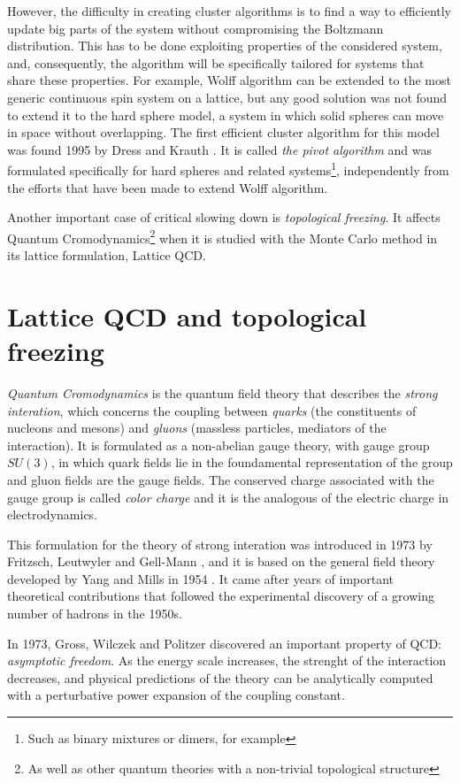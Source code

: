 However, the difficulty in creating cluster algorithms is to find a way to efficiently update big parts of the system without compromising the Boltzmann distribution.
This has to be done exploiting properties of the considered system, and, consequently, the algorithm will be specifically tailored for systems that share these properties.
For example, Wolff algorithm can be extended to the most generic continuous spin system on a lattice,
but any good solution was not found to extend it to the hard sphere model,
\ie a system in which solid spheres can move in space without overlapping.
The first efficient cluster algorithm for this model was found 1995 by Dress and Krauth \cite{dress-krauth:1995}.
It is called \emph{the pivot algorithm} and was formulated specifically for hard spheres and related systems\footnote{Such as binary mixtures or dimers, for example},
independently from the efforts that have been made to extend Wolff algorithm.

Another important case of critical slowing down is \emph{topological freezing}.
It affects Quantum Cromodynamics\footnote{As well as other quantum theories with a non-trivial topological structure}
when it is studied with the Monte Carlo method in its lattice formulation, \ie Lattice QCD.

\section*{Lattice QCD and topological freezing}
\emph{Quantum Cromodynamics} is the quantum field theory that describes the \emph{strong interation},
which concerns the coupling between \emph{quarks} (the constituents of nucleons and mesons) and \emph{gluons} (massless particles, mediators of the interaction).
It is formulated as a non-abelian gauge theory, with gauge group $SU(3)$,
in which quark fields lie in the foundamental representation of the group and gluon fields are the gauge fields.
The conserved charge associated with the gauge group is called \emph{color charge} and it is the analogous of the electric charge in electrodynamics.

This formulation for the theory of strong interation was introduced in 1973 by Fritzsch, Leutwyler and Gell-Mann \cite{fritzsch:1973},
and it is based on the general field theory developed by Yang and Mills in 1954 \cite{yang-mills:1954}.
It came after years of important theoretical contributions that followed the experimental discovery of a growing number of hadrons in the 1950s.

In 1973, Gross, Wilczek \cite{gross-wilczek:1973} and Politzer \cite{politzer:1973} discovered an important property of QCD: \emph{asymptotic freedom}.
As the energy scale increases, the strenght of the interaction decreases,
and physical predictions of the theory can be analytically computed with a perturbative power expansion of the coupling constant.

